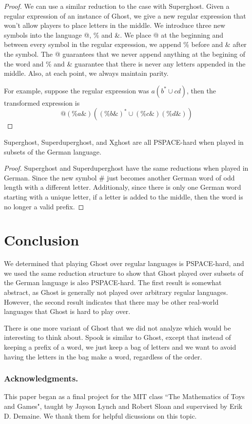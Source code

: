 \documentclass[runningheads,a4paper]{llncs}
\begin{document}
\begin{proof}
We can use a similar reduction to the case with Superghost. Given a regular expression of an instance of Ghost, we give a new regular expression that won't allow players to place letters in the middle. We introduce three new symbols into the language @, \% and \&. We place @ at the beginning and between every symbol in the regular expression, we append \% before and \& after the symbol. The @ guarantees that we never append anything at the begining of the word and \% and \& guarantee that there is never any letters appended in the middle. Also, at each point, we always maintain parity.

For example, suppose the regular expression was $a(b^* \cup cd)$, then the transformed expression is
\[ @(\%a\&)((\%b\&)^* \cup (\%c\&)(\%d\&)) \]
\end{proof}

\begin{corollary}
Superghost, Superduperghost, and Xghost are all PSPACE-hard when played in subsets of the German language.
\end{corollary}

\begin{proof}
Superghost and Superduperghost have the same reductions when played in German. Since the new symbol \# just becomes another German word of odd length with a different letter. Additionaly, since there is only one German word starting with a unique letter, if a letter is added to the middle, then the word is no longer a valid prefix. 
\end{proof}

\section{Conclusion}
\label{Conclusion}

We determined that playing Ghost over regular languages is PSPACE-hard, and we used the same reduction structure to show that Ghost played over subsets of the German language is also PSPACE-hard. The first result is somewhat abstract, as Ghost is generally not played over arbitrary regular languages. However, the second result indicates that there may be other real-world languages that Ghost is hard to play over.

There is one more variant of Ghost that we did not analyze which would be interesting to think about. Spook is similar to Ghost, except that instead of keeping a prefix of a word, we just keep a bag of letters and we want to avoid having the letters in the bag make a word, regardless of the order.

\subsubsection*{Acknowledgments.} This paper began as a final project for the MIT class ``The Mathematics of Toys and Games", taught by Jayson Lynch and Robert Sloan and supervised by Erik D. Demaine. We thank them for helpful dicussions on this topic.



\end{document}
